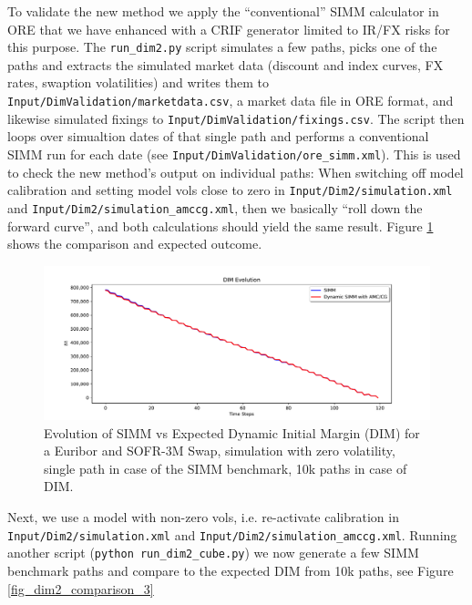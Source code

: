 To validate the new method we apply the ``conventional'' SIMM calculator in ORE that we have enhanced with a CRIF
generator limited to IR/FX risks for this purpose. The {\tt run\_dim2.py} script simulates a few paths, picks one
of the paths and extracts the simulated market data (discount and index curves, FX rates, swaption volatilities)
and writes them to {\tt Input/DimValidation/marketdata.csv}, a market data file in ORE format, and likewise simulated
fixings to {\tt Input/DimValidation/fixings.csv}. The script then loops over simualtion dates of that single path
and performs a conventional SIMM run for each date (see {\tt Input/DimValidation/ore\_simm.xml}).
This is used to check the new method's output on individual paths: When switching off model calibration and setting
model vols close to zero in {\tt Input/Dim2/simulation.xml} and {\tt Input/Dim2/simulation\_amccg.xml}, then we basically
``roll down the forward curve'', and both calculations should yield the same result.
Figure \ref{fig_dim2_comparison_1} shows the comparison and expected outcome.

\begin{figure}[h!]
\begin{center}
\includegraphics[scale=0.5]{examples/mpl_dim_comparison_1.pdf}
\end{center}
\caption{Evolution of SIMM vs Expected Dynamic Initial Margin (DIM) for a Euribor and SOFR-3M Swap, simulation with zero
  volatility, single path in case of the SIMM benchmark, 10k paths in case of DIM.}
\label{fig_dim2_comparison_1}
\end{figure}

Next, we use a model with non-zero vols, i.e. re-activate calibration in {\tt Input/Dim2/simulation.xml} and
{\tt Input/Dim2/simulation\_amccg.xml}. Running another script ({\tt python run\_dim2\_cube.py}) we now generate a few
SIMM benchmark paths and compare to the expected DIM from 10k paths, see Figure  \ref{fig_dim2_comparison_3}

